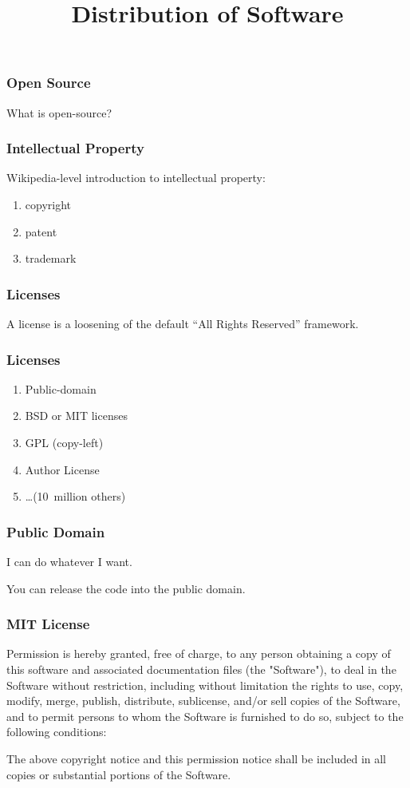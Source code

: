 
\title{Distribution of Software}

\frame{\maketitle}

\begin{frame}[fragile]
\frametitle{Open Source}
What is open-source?
\end{frame}

\begin{frame}[fragile]
\frametitle{Intellectual Property}
Wikipedia-level introduction to intellectual property:
\begin{enumerate}
\item copyright
\item patent 
\item trademark
\end{enumerate}
\end{frame}

\begin{frame}[fragile]
\frametitle{Licenses}
A license is a \alert{loosening} of the default ``All Rights Reserved'' framework.
\end{frame}

\begin{frame}[fragile]
\frametitle{Licenses}
\begin{enumerate}
\item Public-domain
\item BSD or MIT licenses
\item GPL (copy-left)
\item Author License
\item \ldots (10~million others)
\end{enumerate}
\end{frame}

\begin{frame}[fragile]
\frametitle{Public Domain}

I can do whatever I want.

\bigskip
You can release the code into the public domain.
\end{frame}

\begin{frame}[fragile]
\frametitle{MIT License}

Permission is hereby granted, free of charge, to any person
obtaining a copy of this software and associated documentation
files (the "Software"), to deal in the Software without
restriction, \alert{including without limitation the rights to use,
copy, modify, merge, publish, distribute, sublicense, and/or sell
copies of the Software}, and to permit persons to whom the
Software is furnished to do so, subject to the following
conditions:

The above copyright notice and this permission notice shall be
included in all copies or substantial portions of the Software.
\end{frame}

